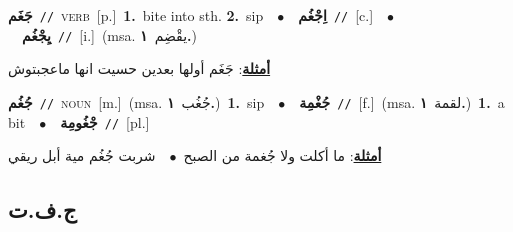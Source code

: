\documentclass[10pt,a4paper,twoside]{article} %
\begin{document}
\begin{multicols}{2}
{\setlength\topsep{0pt}\textbf{\foreignlanguage{arabic}{جَغَم}}\ {\color{gray}\texttt{//}\color{black}}\ \textsc{verb}\ [p.]\ \textbf{1.}~bite into sth.  \textbf{2.}~sip\ \ $\bullet$\ \ \setlength\topsep{0pt}\textbf{\foreignlanguage{arabic}{اِجْغُم}}\ {\color{gray}\texttt{//}\color{black}}\ [c.]\ \ $\bullet$\ \ \setlength\topsep{0pt}\textbf{\foreignlanguage{arabic}{يِجْغُم}}\ {\color{gray}\texttt{//}\color{black}}\ [i.]\ \color{gray}(msa. \foreignlanguage{arabic}{يقْضِم}~\foreignlanguage{arabic}{\textbf{١.}})\color{black}\  \begin{flushright}\color{gray}\foreignlanguage{arabic}{\textbf{\underline{\foreignlanguage{arabic}{أمثلة}}}: جَغَم أولها بعدين حسيت انها ماعجبتوش}\end{flushright}\color{black}} \vspace{2mm}

{\setlength\topsep{0pt}\textbf{\foreignlanguage{arabic}{جُغُم}}\ {\color{gray}\texttt{//}\color{black}}\ \textsc{noun}\ [m.]\ \color{gray}(msa. \foreignlanguage{arabic}{جُغُب}~\foreignlanguage{arabic}{\textbf{١.}})\color{black}\ \textbf{1.}~sip\ \ $\bullet$\ \ \setlength\topsep{0pt}\textbf{\foreignlanguage{arabic}{جُغْمِة}}\ {\color{gray}\texttt{//}\color{black}}\ [f.]\ \color{gray}(msa. \foreignlanguage{arabic}{لقمة}~\foreignlanguage{arabic}{\textbf{١.}})\color{black}\ \textbf{1.}~a bit\ \ $\bullet$\ \ \setlength\topsep{0pt}\textbf{\foreignlanguage{arabic}{جْغُومِة}}\ {\color{gray}\texttt{//}\color{black}}\ [pl.]\  \begin{flushright}\color{gray}\foreignlanguage{arabic}{\textbf{\underline{\foreignlanguage{arabic}{أمثلة}}}: ما أكلت ولا جُغمة من الصبح\ $\bullet$\ \  شربت جُغُم مية أبل ريقي}\end{flushright}\color{black}} \vspace{2mm}

\vspace{-3mm}
\subsection*{\color{blue}\foreignlanguage{arabic}{ج.ف.ت}\color{blue}{}} 


\end{multicols}
\end{document}
